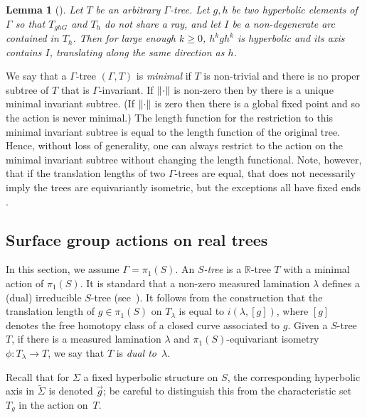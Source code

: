 \documentclass[11pt]{amsart}
\newcommand{\ora}[1]{\overrightarrow{#1}}
\numberwithin{equation}{section}
\numberwithin{figure}{section}
\newtheorem{lemma}[theorem]{Lemma}
\theoremstyle{definition}
\theoremstyle{plain}
\newcommand\bbR{\ensuremath{\mathbb{R}}}
\newcommand*{\wt}[1]{\widetilde{#1}}
\DeclarePairedDelimiter\norm{\lVert}{\rVert}
\begin{document}
\begin{lemma}[{\cite[Fait, page 854]{Gui05:Coeur}}]
Let $T$ be an arbitrary $\Gamma$-tree.
Let $g,h$ be two hyperbolic elements of $\Gamma$ so that
$T_{ghG}$ and $T_h$ do not share a ray, and let $I$ be a non-degenerate arc contained
in $T_h$. Then for large enough $k \geq 0$, $h^k g h^k$ is hyperbolic
and its axis contains $I$, translating along the same direction as $h$.
\label{lem:make_coherent}
\end{lemma}

We say that a $\Gamma$-tree $(\Gamma,T)$ is \emph{minimal} if $T$ is
non-trivial and there is no proper subtree of $T$ that is $\Gamma$-invariant.
If $\norm{\cdot}$ is non-zero then by
\cite[Proposition~3.1]{CM87:GroupActions} there is a
unique minimal invariant subtree.
(If $\norm{\cdot}$ is zero then there
is a global fixed point and so the action is never minimal.)
The length function for the
restriction to this minimal invariant subtree is equal to the length
function of the original tree. Hence, without loss of generality, one
can always restrict to the action on the minimal invariant subtree
without changing the length functional. Note, however, that if the translation lengths of two $\Gamma$-trees are
equal, that does not necessarily imply the trees are equivariantly
isometric, but the exceptions all have fixed ends \cite[Theorem~3.7]{CM87:GroupActions}. 

\subsection{Surface group actions on real trees}

In this section, we assume $\Gamma = \pi_1(S)$. An \emph{$S$-tree} is
a $\bbR$-tree $T$ with a minimal action of $\pi_1(S)$.
It is standard that a non-zero measured lamination $\lambda$ defines a
(dual) irreducible $S$-tree (see~\cite{MO84:Valuations}).
It follows from the construction that the translation length of
$g \in\pi_1(S)$  on
$T_\lambda$ is equal to
$i(\lambda,[g])$, where $[g]$ denotes the free homotopy class of a
closed curve associated to $g$.
Given a $S$-tree $T$, if there is a measured lamination $\lambda$ and $\pi_1(S)$-equivariant isometry $\phi \colon T_\lambda \to T$, we say that $T$ is \emph{dual to}~$\lambda$.

Recall that for $\Sigma$ a fixed hyperbolic structure on $S$, the
corresponding hyperbolic axis in $\wt{\Sigma}$ is denoted $\ora{g}$;
be careful to distinguish this from the characteristic set $T_g$ in
the action on~$T$.
\end{document}
